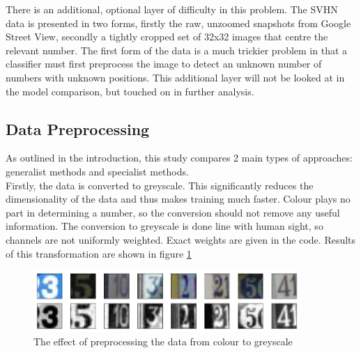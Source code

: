 \documentclass[12pt]{article}
\begin{document}
There is an additional, optional layer of difficulty in this problem. The SVHN data is presented in two forms, firstly the raw, unzoomed snapshots from Google Street View, secondly a tightly cropped set of 32x32 images that centre the relevant number. The first form of the data is a much trickier problem in that a classifier must first preprocess the image to detect an unknown number of numbers with unknown positions. This additional layer will not be looked at in the model comparison, but touched on in further analysis.\\

\subsection{Data Preprocessing}
As outlined in the introduction, this study compares 2 main types of approaches: generalist methods and specialist methods.\\

Firstly, the data is converted to greyscale. This significantly reduces the dimensionality of the data and thus makes training much faster. Colour plays no part in determining a number, so the conversion should not remove any useful information. The conversion to greyscale is done line with human sight, so channels are not uniformly weighted. Exact weights are given in the code. Results of this transformation are shown in figure \ref{fig:togreys}\\
\begin{figure}[h]
  \caption{The effect of preprocessing the data from colour to greyscale}
  \label{fig:togreys}
\centering
\includegraphics[width=0.9\textwidth]{images/colour_to_greyscale.png}
\end{figure}
\end{document}
